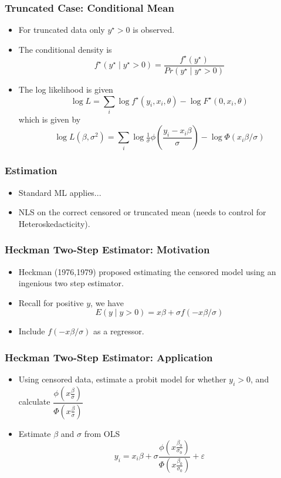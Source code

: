 \documentclass{beamer}
\newcommand{\1}{\mathbb{1}}
\begin{document}
\begin{frame}\frametitle{Truncated Case: Conditional Mean}
\begin{itemize}
\item For truncated data only $y^{\star}>0$ is observed.
\item The conditional density is 
\begin{equation}
f^{\star}(y^{\star} \mid y^{\star}>0) = \dfrac{f^{\star}(y^{\star})}{Pr(y^{\star} \mid y^{\star}>0)}
\end{equation}
\item The log likelihood is given
\begin{equation*}
\log L = \sum_i \log f^{\star}(y_i,x_i,\theta) - \log F^{\star}(0,x_i,\theta) 
\end{equation*}
which is given by
\begin{equation*}
\log L(\beta,\sigma^2) = \sum_i  \log \tfrac{1}{\sigma} \phi \left(\dfrac{y_i-x_i \beta}{\sigma}\right) - \log  \Phi(x_i \beta/ \sigma)
\end{equation*}
\end{itemize}
\end{frame}

\begin{frame}\frametitle{Estimation}
\begin{itemize}
 \item Standard ML applies...
 \item NLS on the correct censored or truncated mean (needs to control for Heteroskedacticity).
\end{itemize}
\end{frame}

\begin{frame}\frametitle{Heckman Two-Step Estimator: Motivation}
\begin{itemize}
\item Heckman (1976,1979) proposed estimating the censored model using an ingenious two step estimator.
\item Recall for positive $y$, we have
\begin{equation}
 E(y \mid y>0) = x\beta + \sigma f(-x\beta / \sigma)
\end{equation}
\item Include $f(-x\beta / \sigma)$ as a regressor.
\end{itemize}
\end{frame}

\begin{frame}\frametitle{Heckman Two-Step Estimator: Application}
\begin{itemize}
 \item Using censored data, estimate a probit model for whether $y_i>0$, and calculate $\dfrac{\phi(x\tfrac{\beta}{\sigma})}{\Phi(x\tfrac{\beta}{\sigma})}$
 \item Estimate $\beta$ and $\sigma$ from OLS
 \begin{equation}
  y_i = x_i \beta + \sigma  \dfrac{\phi(x\tfrac{\beta_0}{\sigma_0})}{\Phi(x\tfrac{\beta_0}{\sigma_0})} + \varepsilon
 \end{equation}
\end{itemize}
\end{frame}
\end{document}
